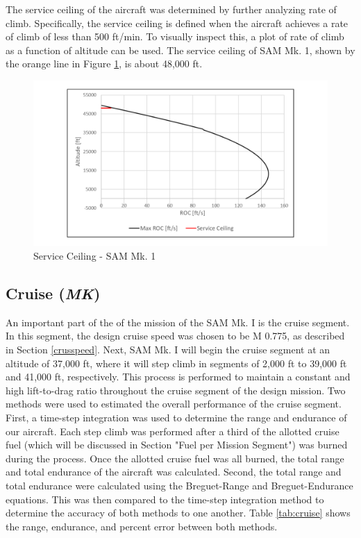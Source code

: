The service ceiling of the aircraft was determined by further analyzing rate of climb. Specifically, the service ceiling is defined when the aircraft achieves a rate of climb of less than 500 ft/min. To visually inspect this, a plot of rate of climb as a function of altitude can be used. The service ceiling of SAM Mk. 1, shown by the orange line in Figure \ref{serceil}, is about 48,000 ft. 

\begin{figure}[H]
    \centering
    \includegraphics[width=1.0\textwidth]{Photos/Service_Ceiling.pdf}
    \caption{Service Ceiling -  SAM Mk. 1}
    \label{serceil}
 \end{figure}

\subsection{Cruise (\textit{MK})}
An important part of the of the mission of the SAM Mk. I is the cruise segment. In this segment, the design cruise speed was chosen to be M 0.775, as described in Section \ref{crusspeed}. Next, SAM Mk. I will begin the cruise segment at an altitude of 37,000 ft, where it will step climb in segments of 2,000 ft to 39,000 ft and 41,000 ft, respectively. This process is performed to maintain a constant and high lift-to-drag ratio throughout the cruise segment of the design mission. Two methods were used to estimated the overall performance of the cruise segment. First, a time-step integration was used to determine the range and endurance of our aircraft. Each step climb was performed after a third of the allotted cruise fuel (which will be discussed in Section "Fuel per Mission Segment") was burned during the process. Once the allotted cruise fuel was all burned, the total range and total endurance of the aircraft was calculated. Second, the total range and total endurance were calculated using the Breguet-Range and Breguet-Endurance equations. This was then compared to the time-step integration method to determine the accuracy of both methods to one another. Table \ref{tab:cruise} shows the range, endurance, and percent error between both methods. 

